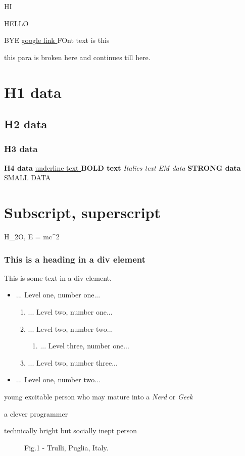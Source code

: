 \documentclass{article}
\begin{document}
\par HI \begin{center} HELLO \end{center} BYE 
\href{www.google.com}{google link }
{\fontsize{40}{48}\selectfont FOnt text is this }\par  this para is broken here \newline
 and continues till here.
\section{ H1 data}
\subsection{ H2 data}
\subsubsection{ H3 data}
\textbf{ H4 data}
\underline{ underline text }\textbf{  BOLD text }\textit{ Italics text }\emph{ EM data }\textbf{ STRONG data }{\fontsize{4}{5}\selectfont SMALL DATA }\section{Subscript, superscript}
\par H_{2}O, E = mc^{2}
\subsubsection{This is a heading in a div element}
\par This is some text in a div element.
\begin{itemize}
\item ... Level one, number one...
\begin{enumerate}
\item ... Level two, number one...
\item ... Level two, number two...
\begin{enumerate}
\item ... Level three, number one...
\end{enumerate}
\item ... Level two, number three...
\end{enumerate}
\item ... Level one, number two...
\end{itemize}
\begin{description}[style=unboxed, labelwidth=\linewidth, font =\sffamily\itshape\bfseries, listparindent =0pt, before =\sffamily]\item[Dweeb]young excitable person who may mature
    into a \emph{Nerd} or \emph{Geek}\item[Hacker]a clever programmer\item[Nerd]technically bright but socially inept person\end{description}
\begin{figure}
\caption{Fig.1 - Trulli, Puglia, Italy.}
\end{figure}
\end{document}
